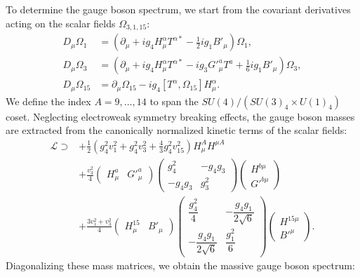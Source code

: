 To determine the gauge boson spectrum, we start from the covariant derivatives acting on the scalar fields $\Omega_{3,1,15}$:
\begin{align*}
D_\mu \Omega_1 &= \left(\partial_\mu + i g_4 H_\mu^\alpha T^{\alpha \ast} - \tfrac{1}{2} i g_1 B'_\mu \right)\Omega_1,  \\
D_\mu \Omega_3 &= \left(\partial_\mu + i g_4 H_\mu^\alpha T^{\alpha\ast} - i g_3 G'^a_\mu T^a  + \tfrac{1}{6} i g_1 B'_\mu \right) \Omega_3,  \\
D_\mu \Omega_{15} &= \partial_\mu \Omega_{15} - i g_4 \left[ T^\alpha, \Omega_{15} \right] H^\alpha_\mu.
\end{align*}
We define the index $A=9,\ldots,14$ to span the $SU(4) / (SU(3)_4 \times U(1)_4)$ coset. Neglecting electroweak symmetry breaking effects, the gauge boson masses are extracted from the canonically normalized kinetic terms of the scalar fields:
\begin{equation}
  \begin{aligned}
  \mathcal L \supset &  
    +\frac{1}{2}\left( g_4^2 v_1^2 + g_4^2 v_3^2 + \frac{4}{3} g_4^2 v_{15}^2\right)H_\mu^A H^{\mu A}  
  \\&
    +\frac{v_3^2}{4}
    \begin{pmatrix}
      H^a_\mu & G'^a_\mu
    \end{pmatrix}
    \begin{pmatrix}
      g_4^2   & - g_4 g_3 \\
    - g_4 g_3 & g_3^2
    \end{pmatrix}
    \begin{pmatrix}
      H^{b\mu} \\ 
      G'^{b\mu}    
    \end{pmatrix}
  \\&
    +\frac{3v_1^2+v_3^2}{4}
    \begin{pmatrix}
      H^{15}_\mu & B'_\mu
    \end{pmatrix}
    \begin{pmatrix}
      \dfrac{g_4^2}{4}   & - \dfrac{g_4 g_1}{2 \sqrt{6}} \\
      - \dfrac{g_4 g_1}{2 \sqrt{6}} & \dfrac{g_1^2}{6}
    \end{pmatrix}
    \begin{pmatrix}
      H^{15\mu} \\ 
      B'^\mu
    \end{pmatrix}.
  \end{aligned}
\end{equation}
Diagonalizing these mass matrices, we obtain the massive gauge boson spectrum:
